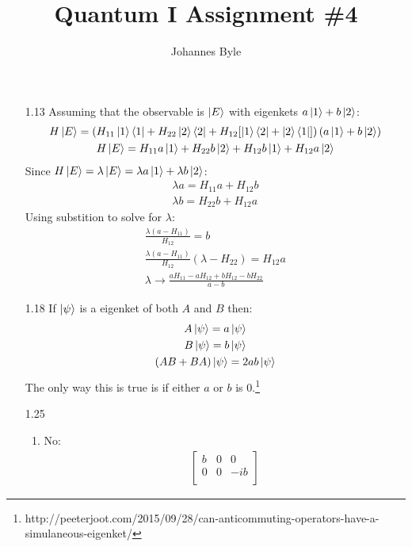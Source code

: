 \documentclass[12pt]{article}
\title{Quantum I Assignment \#4}
\author{Johannes Byle}
\begin{document}
    \maketitle
    \begin{enumerate}
        \item[1.13]
        Assuming that the observable is $\ket{E}$ with eigenkets $a\ket{1}+b\ket{2}$:
        \begin{gather}
            H\ket{E}=\left(H_{11}\ket{1}\bra{1}+H_{22}\ket{2}\bra{2}+H_{12}[\ket{1}\bra{2}+\ket{2}\bra{1}]\right)(a\ket{1}+b\ket{2})\\
            H\ket{E}=H_{11}a\ket{1}+H_{22}b\ket{2}+H_{12}b\ket{1}+H_{12}a\ket{2}
        \end{gather}
        Since $H\ket{E}=\lambda\ket{E}=\lambda a\ket{1}+\lambda b\ket{2}$:
        \begin{gather}
            \lambda a=H_{11}a+H_{12}b\\
            \lambda b=H_{22}b+H_{12}a
        \end{gather}
        Using substition to solve for $\lambda$:
        \begin{gather}
            \frac{\lambda(a-H_{11})}{H_{12}}=b\\
            \frac{\lambda(a-H_{11})}{H_{12}}(\lambda-H_{22})=H_{12}a\\
            \lambda \to \frac{a H_{11}-a H_{12}+b H_{12}-b H_{22}}{a-b}
        \end{gather}
        \item[1.18]
        If $\ket{\psi}$ is a eigenket of both $A$ and $B$ then:
        \begin{gather*}
            A\ket{\psi}=a\ket{\psi}\\
            B\ket{\psi}=b\ket{\psi}\\
            (AB+BA)\ket{\psi}=2ab\ket{\psi}
        \end{gather*}
        The only way this is true is if either $a$ or $b$ is 0.\footnote{http://peeterjoot.com/2015/09/28/can-anticommuting-operators-have-a-simulaneous-eigenket/}
        \item[1.25]
        \begin{enumerate}
            \item No:
            \begin{gather}
                \begin{bmatrix}
                    b & 0  & 0   \\
                    0 & 0  & -ib \\

\end{bmatrix}
\end{gather}
\end{enumerate}
\end{enumerate}
\end{document}
